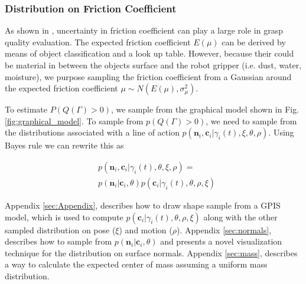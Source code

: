 \documentclass[journal,transmag]{IEEEtran}%
\begin{document}
 
 \subsubsection{Distribution on Friction Coefficient}
As shown in \cite{zheng2005}, uncertainty in friction coefficient can play a large role in grasp quality evaluation. The expected friction coefficient $E(\mu)$ can be derived by means of object classification and a look up table. However, because their could be material in between the objects surface and the robot gripper (i.e. dust, water, moisture), we purpose sampling the friction coefficient from a Gaussian around the expected friction coefficient $\mu \sim N(E(\mu),\sigma_{\mu}^2)$. 
 
 
To estimate $P(Q(\Gamma)>0)$, we sample from the graphical model shown in Fig. \ref{fig:graphical_model}. To sample from $p(Q(\Gamma)>0)$, we need to sample from the distributions associated with a line of action $p(\textbf{n}_i,\textbf{c}_i|\gamma_i(t),\xi,\theta, \rho)$. Using Bayes rule  we can rewrite this as 
 
 \vspace{-2ex}
 \begin{align*}
 &p(\textbf{n}_i,\textbf{c}_i |\gamma_i(t),\theta,\xi,\rho)=\\
 &p(\textbf{n}_i|\textbf{c}_i,\theta)p(\textbf{c}_i|\gamma_i(t),\theta,\rho,\xi)
 \end{align*}
 
 Appendix \ref{sec:Appendix}, describes how to draw shape sample from a GPIS model, which is used to compute $p(\textbf{c}_i|\gamma_i(t),\theta,\rho,\xi)$ along with the other sampled distribution on pose ($\xi$) and motion ($\rho$). Appendix \ref{sec:normals}, describes how to sample from $p(\textbf{n}_i|\textbf{c}_i,\theta)$ and presents a novel visualization technique for the distribution on surface normals.  Appendix \ref{sec:mass}, describes a way to calculate the expected center of mass assuming a uniform mass distribution. 
 
 
\end{document}
